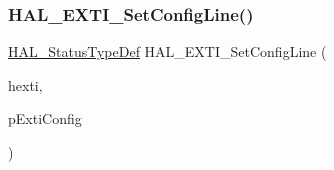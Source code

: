\mbox{\label{group___e_x_t_i___exported___functions___group1_ga21c31dc6d13f1e32b4352e00ab6ad2b3}} 
\subsubsection{\texorpdfstring{H\+A\+L\+\_\+\+E\+X\+T\+I\+\_\+\+Set\+Config\+Line()}{HAL\_EXTI\_SetConfigLine()}}
{\footnotesize\ttfamily \hyperlink{stm32f4xx__hal__def_8h_a63c0679d1cb8b8c684fbb0632743478f}{H\+A\+L\+\_\+\+Status\+Type\+Def} H\+A\+L\+\_\+\+E\+X\+T\+I\+\_\+\+Set\+Config\+Line (\begin{DoxyParamCaption}\item[{\hyperlink{struct_e_x_t_i___handle_type_def}{E\+X\+T\+I\+\_\+\+Handle\+Type\+Def} $\ast$}]{hexti,  }\item[{\hyperlink{struct_e_x_t_i___config_type_def}{E\+X\+T\+I\+\_\+\+Config\+Type\+Def} $\ast$}]{p\+Exti\+Config }\end{DoxyParamCaption})}

